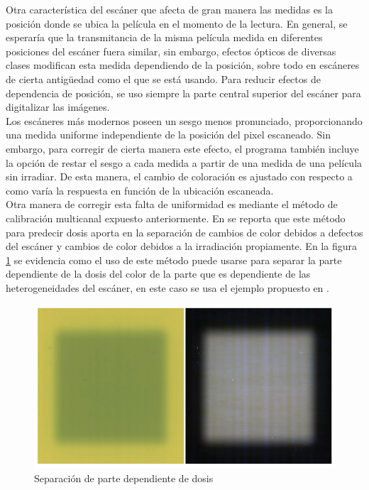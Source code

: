 Otra característica del escáner que afecta de gran manera las medidas es la posición donde se ubica la película en el momento de la lectura. En general, se esperaría que la transmitancia de la misma película medida en diferentes posiciones del escáner fuera similar, sin embargo, efectos ópticos de diversas clases modifican esta medida dependiendo de la posición, sobre todo en escáneres de cierta antigüedad como el que se está usando. Para reducir efectos de dependencia de posición, se uso siempre la parte central superior del escáner para digitalizar las imágenes.\\

Los escáneres más modernos poseen un sesgo menos pronunciado, proporcionando una medida uniforme independiente de la posición del pixel escaneado. Sin embargo, para corregir de cierta manera este efecto, el programa también incluye la opción de restar el sesgo a cada medida a partir de una medida de una película sin irradiar. De esta manera, el cambio de coloración es ajustado con respecto a como varía la respuesta en función de la ubicación escaneada. \\

Otra manera de corregir esta falta de uniformidad es mediante el método de calibración multicanal expuesto anteriormente. En \cite{Micke2011} se reporta que este método para predecir dosis aporta en la separación de cambios de color debidos a defectos del escáner y cambios de color debidos a la irradiación propiamente. En la figura \ref{fig:Multicanal} se evidencia como el uso de este método puede usarse para separar la parte dependiente de la dosis del color de la parte que es dependiente de las heterogeneidades del escáner, en este caso se usa el ejemplo propuesto en \cite{Micke2011}. \\

\begin{figure}
	\centering
	\includegraphics[width=0.7\linewidth]{images/imagenMicke.png}
	
	\caption{Separación de parte dependiente de dosis\cite{Micke2011}}
	\label{fig:Multicanal}
\end{figure}

